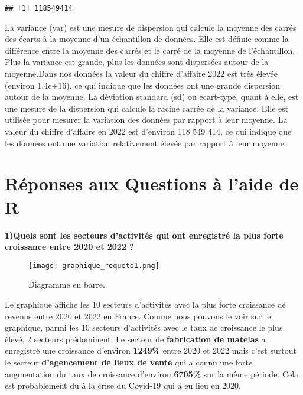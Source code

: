\documentclass[mstat,12pt]{unswthesis}
\begin{document}
\begin{verbatim}
## [1] 118549414
\end{verbatim}

\medskip

La variance (var) est une mesure de dispersion qui calcule la moyenne
des carrés des écarts à la moyenne d'un échantillon de données. Elle est
définie comme la différence entre la moyenne des carrés et le carré de
la moyenne de l'échantillon. Plus la variance est grande, plus les
données sont dispersées autour de la moyenne.Dans nos données la valeur
du chiffre d'affaire 2022 est très élevée (environ 1.4e+16), ce qui
indique que les données ont une grande dispersion autour de la moyenne.
La déviation standard (sd) ou ecart-type, quant à elle, est une mesure
de la dispersion qui calcule la racine carrée de la variance. Elle est
utilisée pour mesurer la variation des données par rapport à leur
moyenne. La valeur du chiffre d'affaire en 2022 est d'environ 118 549
414, ce qui indique que les données ont une variation relativement
élevée par rapport à leur moyenne.

\bigskip

\hypertarget{ruxe9ponses-aux-questions-uxe0-laide-de-r}{%
\section{\texorpdfstring{\textbf{Réponses aux Questions à l'aide de
R}}{Réponses aux Questions à l'aide de R}}\label{ruxe9ponses-aux-questions-uxe0-laide-de-r}}

\medskip

\textbf{1)Quels sont les secteurs d'activités qui ont enregistré la plus
forte croissance entre 2020 et 2022 ?}

\medskip

\begin{figure}
\centering
\texttt{[image: graphique\_requete1.png]}
\caption{Diagramme en barre.}
\end{figure}

\medskip

Le graphique affiche les 10 secteurs d'activités avec la plus forte
croissance de revenus entre 2020 et 2022 en France. Comme nous pouvons
le voir sur le graphique, parmi les 10 secteurs d'activités avec le taux
de croissance le plus élevé, 2 secteurs prédominent. Le secteur de
\textbf{fabrication de matelas} a enregistré une croissance d'environ
\textbf{1249\%} entre 2020 et 2022 mais c'est surtout le secteur
\textbf{d'agencement de lieux de vente} qui a connu une forte
augmentation du taux de croissance d'environ \textbf{6705\%} sur la même
période. Cela est probablement du à la crise du Covid-19 qui a eu lieu
en 2020.
\end{document}
